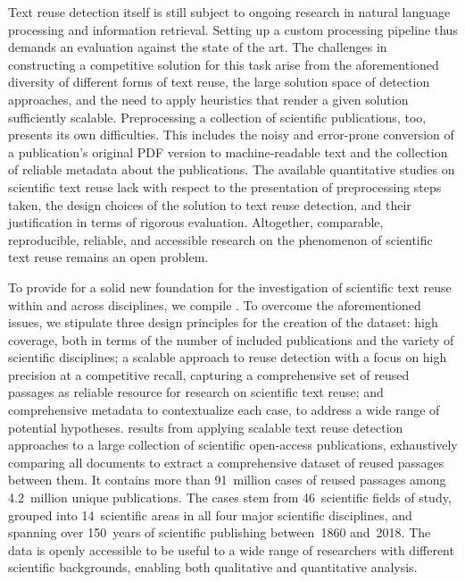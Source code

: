 Text reuse detection itself is still subject to ongoing research in natural language processing and information retrieval. Setting up a custom processing pipeline thus demands an evaluation against the state of the art. The challenges in constructing a competitive solution for this task arise from the aforementioned diversity of different forms of text reuse, the large solution space of detection approaches, and the need to apply heuristics that render a given solution sufficiently scalable. Preprocessing a collection of scientific publications, too, presents its own difficulties. This includes the noisy and error-prone conversion of a publication's original PDF version to machine-readable text and the collection of reliable metadata about the publications. The available quantitative studies on scientific text reuse lack with respect to the presentation of preprocessing steps taken, the design choices of the solution to text reuse detection, and their justification in terms of rigorous evaluation. Altogether, comparable, reproducible, reliable, and accessible research on the phenomenon of scientific text reuse remains an open problem.

To provide for a solid new foundation for the investigation of scientific text reuse within and across disciplines, we compile \webisReuseCorpus. To overcome the aforementioned issues, we stipulate three design principles for the creation of the dataset:
\Ni
high coverage, both in terms of the number of included publications and the variety of scientific disciplines;
\Nii
a scalable approach to reuse detection with a focus on high precision at a competitive recall, capturing a comprehensive set of reused passages as reliable resource for research on scientific text reuse; and 
\Niii
comprehensive metadata to contextualize each case, to address a wide range of potential hypotheses.
\newpage
\webisReuseCorpus results from applying scalable text reuse detection approaches to a large collection of scientific open-access publications, exhaustively comparing all documents to extract a comprehensive dataset of reused passages between them. It contains more than 91~million cases of reused passages among 4.2~million unique publications. The cases stem from 46~scientific fields of study, grouped into 14~scientific areas in all four major scientific disciplines, and spanning over 150~years of scientific publishing between~1860 and~2018. The data is openly accessible to be useful to a wide range of researchers with different scientific backgrounds, enabling both qualitative and quantitative analysis.



